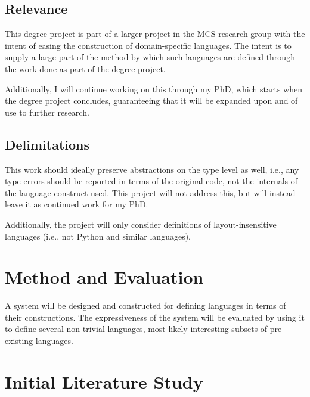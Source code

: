 \documentclass[10pt,a4paper]{article}
\begin{document}
\subsection{Relevance}
This degree project is part of a larger project in the MCS research group with the intent of easing the construction of domain-specific languages. The intent is to supply a large part of the method by which such languages are defined through the work done as part of the degree project.

Additionally, I will continue working on this through my PhD, which starts when the degree project concludes, guaranteeing that it will be expanded upon and of use to further research.

\subsection{Delimitations}
This work should ideally preserve abstractions on the type level as well, i.e., any type errors should be reported in terms of the original code, not the internals of the language construct used. This project will not address this, but will instead leave it as continued work for my PhD.

Additionally, the project will only consider definitions of layout-insensitive languages (i.e., not Python and similar languages).

\section{Method and Evaluation}

A system will be designed and constructed for defining languages in terms of their constructions. The expressiveness of the system will be evaluated by using it to define several non-trivial languages, most likely interesting subsets of pre-existing languages.

\section{Initial Literature Study}
\end{document}
